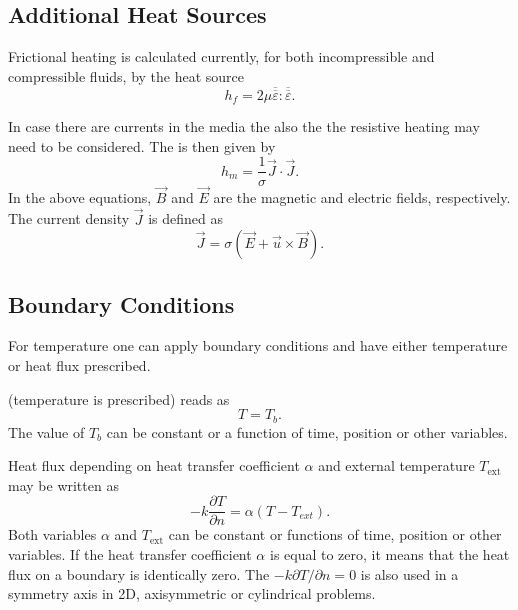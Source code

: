 \begin{versiona}
\subsection{Additional Heat Sources}

Frictional heating is calculated currently, for both incompressible and 
compressible fluids, by the heat source
\begin{equation}
h_f = 2\mu\overline{\overline\varepsilon}:\overline{\overline\varepsilon}.
\end{equation}

In case there are currents in the media the also the 
the resistive heating may need to be considered.
The  is then given by
\begin{equation}
h_m = \frac{1}{\sigma} \vec J \cdot \vec J.
\end{equation}
In the above equations, $\vec B$ and $\vec E$ are the magnetic and electric
fields, respectively. The current density $\vec J$ is defined as
\begin{equation}
\vec J = \sigma(\vec E + \vec u\times \vec B).
\end{equation}


\subsection{Boundary Conditions}
For temperature one can apply boundary conditions and have either temperature 
or heat flux prescribed.

 (temperature is 
prescribed) reads as
\begin{equation}
T=T_b.
\end{equation}
\noindent The value  of $T_b$ can be constant or a function of time, position or 
other variables. 

Heat flux depending on heat transfer coefficient $\alpha$ and external
temperature $T_{\mathrm{ext}}$ may be written as
\begin{equation}
-k\frac{\partial T}{\partial n} =\alpha (T-T_{ext} ).
\end{equation}
Both variables $\alpha$ and $T_\mathrm{ext}$ can be constant or functions of time, 
position or other variables. If the heat transfer coefficient $\alpha$ is equal
to zero, it means that the heat flux on a boundary is identically zero. The 
 $-k\partial T/\partial n =0$ is also used in a 
symmetry axis in 2D, axisymmetric or cylindrical problems.


\end{versiona}
